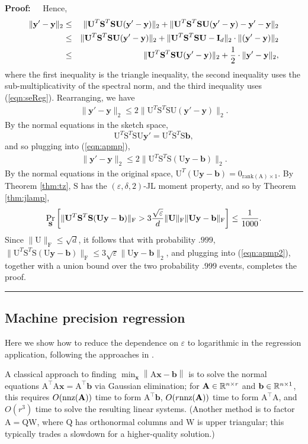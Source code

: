 \documentclass[11pt]{article}
\newcommand{\R}{\ensuremath\mathbb{R}}
\newcommand{\FNorm }[1]{\mbox{}\|#1\|_\mathrm{F}  }
\newenvironment{proof}{\begin{trivlist} \item {\bf Proof:~~}}
  {\qed\end{trivlist}}
\newcommand{\mat}[1]{{\ensuremath{\bm{\mathrm{#1}}}}}
\def\b{{\mathbf b}}
\def\matA{\mat{A}}
\def\matI{\mat{I}}
\def\matQ{\mat{Q}}
\def\matS{\mat{S}}
\def\matU{\mat{U}}
\def\matW{\mat{W}}
\def\nnz{{ \rm nnz }}
\def\frac#1#2{{#1\over #2}}
\def\qed{\hfill\rule{2mm}{2mm}}
\def\x{{\mathbf x}}
\def\y{{\mathbf y}}
\def\b{{\mathbf b}}
\def\norm#1{{\left\|#1\right\|}}
\newcommand{\eps}{\varepsilon}
\begin{document}
\begin{proof}
Hence,
\begin{eqnarray*}
\|\y'-\y\|_2 & \leq & \|\matU^T \matS^T \matS \matU(\y'-\y)\|_2 + \|\matU^T \matS^T \matS \matU (\y'-\y) - \y'-\y\|_2\\
& \leq & \|\matU^T \matS^T \matS \matU(\y'-\y)\|_2 + \|\matU^T \matS^T \matS \matU - \matI_d\|_2 \cdot \|(\y'-\y)\|_2\\
& \leq & \|\matU^T \matS^T \matS \matU(\y'-\y)\|_2 + \frac{1}{2} \cdot \|\y'-\y\|_2,
\end{eqnarray*}
where the first inequality is the triangle inequality, the second inequality uses the sub-multiplicativity of the spectral norm, 
and the third inequality uses (\ref{eqn:seReg}). Rearranging, we have
\begin{eqnarray}\label{eqn:apmp}
\|\y'-\y\|_2 \leq 2 \|\matU^T \matS^T \matS \matU(\y'-\y)\|_2.
\end{eqnarray}
By the normal equations in the sketch space, 
$$\matU^T \matS^T \matS \matU \y' = \matU^T \matS^T \matS \b,$$
and so plugging into (\ref{eqn:apmp}),
\begin{eqnarray}\label{eqn:apmp2}
\|\y'-\y\|_2 \leq 2 \|\matU^T \matS^T \matS (\matU\y - \b)\|_2.
\end{eqnarray}
By the normal equations in the original space, $\matU^T (\matU\y-\b) = \mat0_{\textrm{rank}(\matA) \times 1}$.
By Theorem \ref{thm:tz}, $\matS$ has the $(\eps, \delta, 2)$-JL moment property, and so by Theorem \ref{thm:jlamp},
$$\Pr_{\matS} \left [\FNorm{\matU^T \matS^T \matS (\matU\y-\b)} 
> 3 \frac{\sqrt{\eps}}{d} \FNorm{\matU} \FNorm{\matU\y-\b} \right ] \leq \frac{1}{1000}.$$
Since $\FNorm{\matU} \leq \sqrt{d}$, it follows that with probability $.999$, 
$\FNorm{\matU^T \matS^T \matS (\matU\y-\b)} \leq 3 \sqrt{\eps} \|\matU\y-\b\|_2$, and plugging into (\ref{eqn:apmp2}),
together with a union bound over the two probability $.999$ events, completes the proof. 
\end{proof}

\subsection{Machine precision regression}\label{sec:machinePrecision}
Here we show how to reduce the dependence on $\eps$ to logarithmic in the regression application, 
following the approaches in \cite{RT08,amt10,CW13}. 

A classical approach to finding $\min_{\x} \norm{\matA \x- \b}$
is to solve the normal equations 
$\matA^\top \matA \x = \matA^\top \b$ via Gaussian elimination;
for $\matA\in\R^{n\times r}$ and $\b\in\R^{n\times 1}$,
this requires $O(\nnz(\matA))$ time to
form $\matA^\top \b$, $O(r\nnz(\matA))$ time to form $\matA^\top \matA$,
and $O(r^3)$ time to solve the resulting linear systems.
(Another method is to factor $\matA= \matQ \matW$,
where $\matQ$ has orthonormal columns and $\matW$ is
upper triangular; this typically trades a slowdown for a higher-quality solution.)
\end{document}
